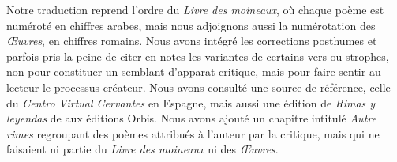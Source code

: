 \documentclass[a4paper,12pt]{book}
\begin{document}

Notre traduction reprend l'ordre du \emph{Livre des moineaux}, où
chaque poème est numéroté en chiffres arabes, mais nous adjoignons
aussi la numérotation des \emph{Œuvres}, en chiffres romains. Nous
avons intégré les corrections posthumes et parfois pris la peine de
citer en notes les variantes de certains vers ou strophes, non pour
constituer un semblant d'apparat critique, mais pour faire sentir au
lecteur le processus créateur. Nous avons consulté une source de
référence, celle du \emph{Centro Virtual Cervantes} en Espagne, mais
aussi une édition de \emph{Rimas y leyendas} de 
aux éditions Orbis. Nous avons ajouté un chapitre intitulé \emph{Autre
rimes} regroupant des poèmes attribués à l'auteur par la critique,
mais qui ne faisaient ni partie du \emph{Livre des moineaux} ni des
\emph{Œuvres}.
\end{document}
